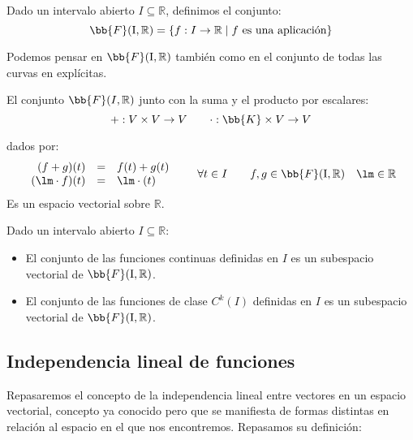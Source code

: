 \begin{definicion}
    Dado un intervalo abierto $I\subseteq \mathbb{R}$, definimos el conjunto:
    \begin{equation*}
        \bb{F}(\text{I},\mathbb{R}) = \{f:I\rightarrow\mathbb{R} \mid f \text{\ es una aplicación}\}
    \end{equation*}
\end{definicion}
Podemos pensar en $\bb{F}(\text{I}, \mathbb{R})$ también como en el conjunto de todas las curvas en explícitas.

\begin{prop}
    El conjunto $\bb{F}(I,\mathbb{R})$ junto con la suma y el producto por escalares:
    \begin{equation*}
        +:V\times V\rightarrow V \qquad \cdot:\bb{K}\times V\rightarrow V
    \end{equation*}

    dados por:
    \begin{equation*}
        \begin{array}{rcl}
            (f+g)(t) &=& f(t) + g(t) \\
            (\lm \cdot f)(t) &=& \lm \cdot (t)
        \end{array} \qquad \forall t\in I \qquad f,g\in \bb{F}(\text{I},\mathbb{R}) \quad \lm \in \mathbb{R}
    \end{equation*}
    Es un espacio vectorial sobre $\mathbb{R}$.
\end{prop}

\begin{prop}
    Dado un intervalo abierto $I\subseteq \mathbb{R}$:
    \begin{itemize}
        \item El conjunto de las funciones continuas definidas en $I$ es un subespacio vectorial de $\bb{F}(\text{I},\mathbb{R})$.
        \item El conjunto de las funciones de clase $C^k(I)$ definidas en $I$ es un subespacio vectorial de $\bb{F}(\text{I},\mathbb{R})$.
    \end{itemize}
\end{prop}

\subsection{Independencia lineal de funciones}
Repasaremos el concepto de la independencia lineal entre vectores en un espacio vectorial, concepto ya conocido pero que se manifiesta de formas distintas en relación al espacio en el que nos encontremos. Repasamos su definición:

